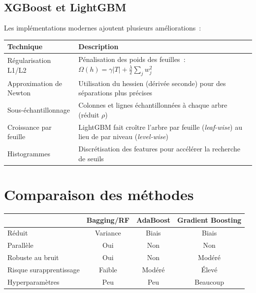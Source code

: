 \subsection{XGBoost et LightGBM}

Les impl\'ementations modernes ajoutent plusieurs am\'eliorations~:

\begin{formules}[title=\textbf{Am\'eliorations de XGBoost/LightGBM}]
\begin{center}
\begin{tabular}{lp{8cm}}
\toprule
\textbf{Technique} & \textbf{Description} \\
\midrule
R\'egularisation L1/L2 & P\'enalisation des poids des feuilles~:
  $\Omega(h) = \gamma|T| + \frac{\lambda}{2}\sum_j w_j^2$ \\
Approximation de Newton & Utilisation du hessien (d\'eriv\'ee seconde) pour
  des s\'eparations plus pr\'ecises \\
Sous-\'echantillonnage & Colonnes et lignes \'echantillonn\'ees \`a chaque
  arbre (r\'eduit $\rho$) \\
Croissance par feuille & LightGBM fait cro\^itre l'arbre par feuille
  (\emph{leaf-wise}) au lieu de par niveau (\emph{level-wise}) \\
Histogrammes & Discr\'etisation des features pour acc\'el\'erer la recherche
  de seuils \\
\bottomrule
\end{tabular}
\end{center}
\end{formules}

\section{Comparaison des m\'ethodes}
\label{sec:comparaison}

\begin{formules}[title=\textbf{Tableau comparatif}]
\begin{center}
\begin{tabular}{lccc}
\toprule
& \textbf{Bagging/RF} & \textbf{AdaBoost} & \textbf{Gradient Boosting} \\
\midrule
R\'eduit & Variance & Biais & Biais \\
Parall\`ele & Oui & Non & Non \\
Robuste au bruit & Oui & Non & Mod\'er\'e \\
Risque surapprentissage & Faible & Mod\'er\'e & \'Elev\'e \\
Hyperparam\`etres & Peu & Peu & Beaucoup \\
\bottomrule
\end{tabular}
\end{center}
\end{formules}

